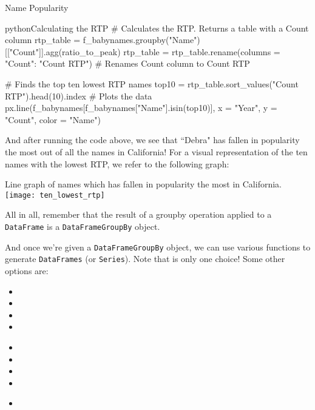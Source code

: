 \documentclass[openany]{book}
\begin{document}
\begin{casestudy*}[parbox=false]{Name Popularity}{}
\begin{code}{python}{Calculating the RTP}
# Calculates the RTP. Returns a table with a Count column
rtp_table = f_babynames.groupby("Name")[["Count"]].agg(ratio_to_peak)
rtp_table = rtp_table.rename(columns = {"Count": "Count RTP"}) # Renames Count column to Count RTP

# Finds the top ten lowest RTP names
top10 = rtp_table.sort_values("Count RTP").head(10).index
# Plots the data
px.line(f_babynames[f_babynames["Name"].isin(top10)], x = "Year", y = "Count", color = "Name")
\end{code}

And after running the code above, we see that ``Debra" has fallen in popularity the most out of all the names in California! For a visual representation of the ten names with the lowest RTP, we refer to the following graph:
\begin{figurebox}[nofloat]{Line graph of names which has fallen in popularity the most in California.}
	\centering\texttt{[image: ten\_lowest\_rtp]}
\end{figurebox}
\end{casestudy*}

All in all, remember that the result of a groupby operation applied to a \texttt{DataFrame} is a \texttt{DataFrameGroupBy} object.

And once we're given a \texttt{DataFrameGroupBy} object, we can use various functions to generate \texttt{DataFrames} (or \texttt{Series}). Note that  is only one choice! Some other options are:

\begin{paracol}{3}
	\begin{itemize}
		\item {}
		\item {}
		\item {}
		\item {}
	\end{itemize}
	\switchcolumn
	\begin{itemize}
		\item {}
		\item {}
		\item {}
		\item {}
	\end{itemize}
	\switchcolumn
	\begin{itemize}
		\item {}
	\end{itemize}
\end{paracol}
\end{document}
